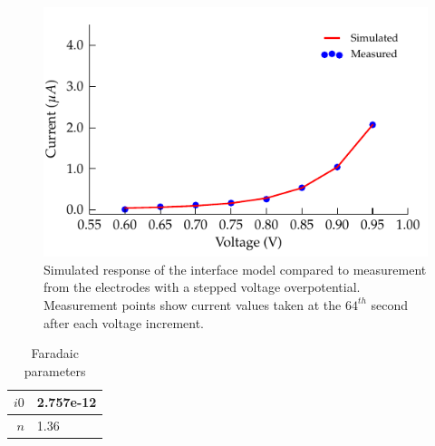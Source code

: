 \documentclass[journal, a4paper]{IEEEtran}
\begin{document}
\begin{figure}
    \begin{center}
        \includegraphics{graphics/faradaic_currentVsVoltageIEEE}
    \end{center}
    \caption{Simulated response of the interface model compared to measurement from the electrodes with a stepped voltage overpotential. Measurement points show current values taken at the $64^{th}$ second after each voltage increment.}
    \label{fig:faradaic_currentVsVoltage}
\end{figure}

\begin{table}
    \begin{center}
        \begin{tabular}{|r|l|}
            \hline
            $i0$ & 2.757e-12\\ \hline
            $n$ & 1.36\\ \hline
        \end{tabular}
    \end{center}
    \caption{Faradaic parameters}
    \label{tab:FaradaicParams}
\end{table}

\end{document}
